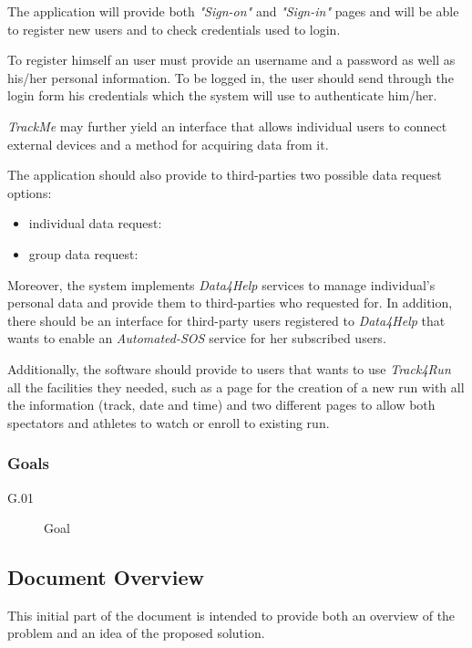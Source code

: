 \documentclass[a4paper]{article}
\begin{document}
        The application will provide both \textit{"Sign-on"} and \textit{"Sign-in"} pages and will be able to register new users and to check credentials used to login.
        
        To register himself an user must provide an username and a password as well as his/her personal information. To be logged in, the user should send through the login form his credentials which the system will use to authenticate him/her.
        
        \textit{TrackMe} may further yield an interface that allows individual users to connect external devices and a method for acquiring data from it.
        
        The application should also provide to third-parties two possible data request options:
        \begin{itemize}
            \item individual data request:
            \item group data request:
        \end{itemize}
        
        Moreover, the system implements \textit{Data4Help} services to manage individual's personal data and provide them to third-parties who requested for. In addition, there should be an interface for third-party users registered to \textit{Data4Help} that wants to enable an \textit{Automated-SOS} service for her subscribed users.
        
        Additionally, the software should provide to users that wants to use \textit{Track4Run} all the facilities they needed, such as a page for the creation of a new run with all the information (track, date and time) and two different pages to allow both spectators and athletes to watch or enroll to existing run.
        
        \subsubsection{Goals}
        
        \begin{description}
            \item[G.01] Goal
        \end{description}
    
    \subsection{Document Overview}
        This initial part of the document is intended to provide both an overview of the problem and an idea of the proposed solution.
        
\end{document}
